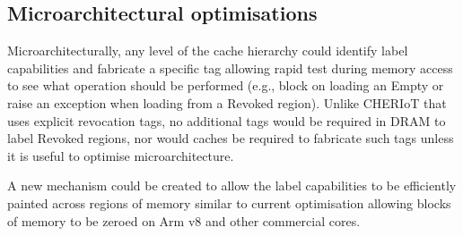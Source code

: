 \subsection{Microarchitectural optimisations}

Microarchitecturally, any level of the cache hierarchy could identify
label capabilities and fabricate a specific tag allowing rapid test
during memory access to see what operation should be performed (e.g.,
block on loading an Empty or raise an exception when loading from a
Revoked region).  Unlike CHERIoT that uses explicit revocation tags, no
additional tags would be required in DRAM to label Revoked regions,
nor would caches be required to fabricate such tags unless it is
useful to optimise microarchitecture.

A new mechanism could be created to allow the label capabilities to be
efficiently painted across regions of memory similar to current
optimisation allowing blocks of memory to be zeroed on Arm v8 and
other commercial cores.

